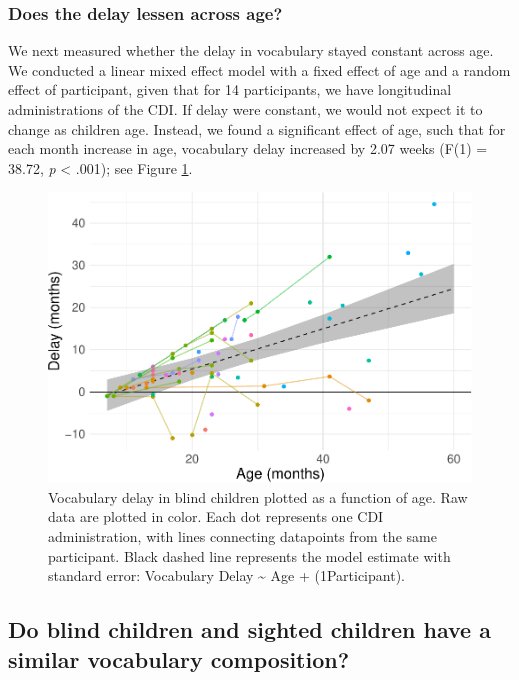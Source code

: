 \documentclass[english,man,floatsintext]{apa6}
\begin{document}
\hypertarget{does-the-delay-lessen-across-age}{%
\subsubsection{Does the delay lessen across age?}\label{does-the-delay-lessen-across-age}}

We next measured whether the delay in vocabulary stayed constant across age. We conducted a linear mixed effect model with a fixed effect of age and a random effect of participant, given that for 14 participants, we have longitudinal administrations of the CDI. If delay were constant, we would not expect it to change as children age. Instead, we found a significant effect of age, such that for each month increase in age, vocabulary delay increased by 2.07 weeks (F(1) = 38.72, \emph{p} \textless{} .001); see Figure \ref{fig:longitudinal-plot}.

\begin{figure}
\centering
\includegraphics{VI_CDI_manuscript_files/figure-latex/longitudinal-plot-1.pdf}
\caption{\label{fig:longitudinal-plot}Vocabulary delay in blind children plotted as a function of age. Raw data are plotted in color. Each dot represents one CDI administration, with lines connecting datapoints from the same participant. Black dashed line represents the model estimate with standard error: Vocabulary Delay \textasciitilde{} Age + (1\textbar{}Participant).}
\end{figure}

\hypertarget{do-blind-children-and-sighted-children-have-a-similar-vocabulary-composition}{%
\subsection{Do blind children and sighted children have a similar vocabulary composition?}\label{do-blind-children-and-sighted-children-have-a-similar-vocabulary-composition}}
\end{document}
